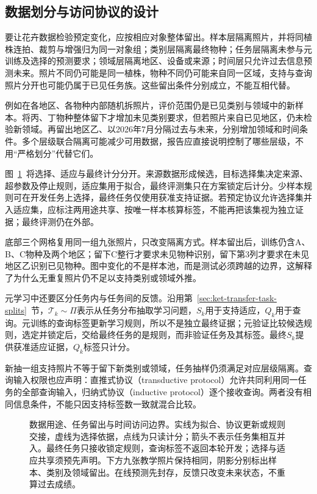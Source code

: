 \subsection{数据划分与访问协议的设计}
\label{sec:ket-evaluation-splits}

要让花卉数据检验预定变化，应按相应对象整体留出。样本层隔离照片，并将同植株连拍、裁剪与增强归为同一对象组；类别层隔离最终物种；任务层隔离未参与元训练及选择的预测要求；领域层隔离地区、设备或来源；时间层只允许过去信息预测未来。照片不同仍可能是同一植株，物种不同仍可能来自同一区域，支持与查询照片分开也可能仍属于已见任务族。这些留出条件分别成立，不能互相代替。

例如在各地区、各物种内部随机拆照片，评价范围仍是已见类别与领域中的新样本。将丙、丁物种整体留下才增加未见类别要求，但若照片来自已见地区，仍未检验新领域。再留出地区乙、以2026年7月分隔过去与未来，分别增加领域和时间条件。多个层级联合隔离可能减少可用数据，报告应直接说明控制了哪些层级，不用“严格划分”代替它们。

图~\ref{fig:ket-evaluation-boundaries}~将选择、适应与最终计分分开。来源数据形成候选，目标选择集决定来源、超参数及停止规则，适应集用于拟合，最终评测集只在方案锁定后计分。少样本规则可在开发任务上选择，最终任务仅使用获准支持证据。若预定协议允许选择集并入适应集，应标注两用途共享、按唯一样本核算标签，不能再把该集视为独立证据；最终评测仍在外部。

底部三个网格复用同一组九张照片，只改变隔离方式。样本留出后，训练仍含A、B、C物种及两个地区；留下C整行才要求未见物种识别，留下第3列才要求在未见地区乙识别已见物种。图中变化的不是样本池，而是测试必须跨越的边界，这解释了为什么无重复照片仍不足以支持类别或领域外推。

元学习中还要区分任务内与任务间的反馈。沿用第~\ref{sec:ket-transfer-task-splits}~节，$\mathcal T_k\sim\Pi$表示从任务分布抽取学习问题，$S_k$用于支持适应，$Q_k$用于查询。元训练的查询标签更新学习规则，所以不是独立最终证据；元验证比较候选规则，选定并锁定后，交给最终任务的是规则，而非验证任务及其标签。最终$S_k$提供获准适应证据，$Q_k$标签只计分。

新抽一组支持照片不等于留下新类别或领域，任务抽样仍须满足对应层级隔离。查询输入权限也应声明：直推式协议（transductive protocol）允许共同利用同一任务的全部查询输入，归纳式协议（inductive protocol）逐个接收查询。两者没有相同信息条件，不能只因支持标签数一致就混合比较。

\begin{figure}[htbp]
  \centering
  
  \caption{数据用途、任务留出与时间访问边界。实线为拟合、协议更新或规则交接，虚线为选择依据，点线为只读计分；箭头不表示任务集相互并入。最终任务只接收锁定规则，查询标签不返回本轮开发；选择与适应共享须预先声明。下方九张教学照片保持相同，阴影分别标出样本、类别及领域留出。在线预测先封存，反馈只改变未来状态，不重算过去成绩。}
  \label{fig:ket-evaluation-boundaries}
\end{figure}
\FloatBarrier

